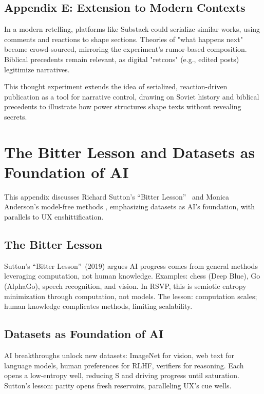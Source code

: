 \documentclass[openany]{book}
\newcommand{\Sent}{S} %
\begin{document}
\section{Appendix E: Extension to Modern Contexts}
In a modern retelling, platforms like Substack could serialize similar works, using comments and reactions to shape sections. Theories of "what happens next" become crowd-sourced, mirroring the experiment's rumor-based composition. Biblical precedents remain relevant, as digital "retcons" (e.g., edited posts) legitimize narratives.

This thought experiment extends the idea of serialized, reaction-driven publication as a tool for narrative control, drawing on Soviet history and biblical precedents to illustrate how power structures shape texts without revealing secrets.

\chapter{The Bitter Lesson and Datasets as Foundation of AI}
\label{app:bitter-lesson}

This appendix discusses Richard Sutton's \textquotedblleft Bitter Lesson\textquotedblright\ \citep{sutton2019} and Monica Anderson's model-free methods \citep{anderson2014}, emphasizing datasets as AI's foundation, with parallels to UX enshittification.

\section{The Bitter Lesson}
\label{sec:bitter-lesson}
Sutton's \textquotedblleft Bitter Lesson\textquotedblright\ (2019) argues AI progress comes from general methods leveraging computation, not human knowledge. Examples: chess (Deep Blue), Go (AlphaGo), speech recognition, and vision. In RSVP, this is semiotic entropy minimization through computation, not models. The lesson: computation scales; human knowledge complicates methods, limiting scalability.

\section{Datasets as Foundation of AI}
\label{sec:datasets-foundation}
AI breakthroughs unlock new datasets: ImageNet for vision, web text for language models, human preferences for RLHF, verifiers for reasoning. Each opens a low-entropy well, reducing \Sent{} and driving progress until saturation. Sutton's lesson: parity opens fresh reservoirs, paralleling UX's cue wells.
\end{document}
